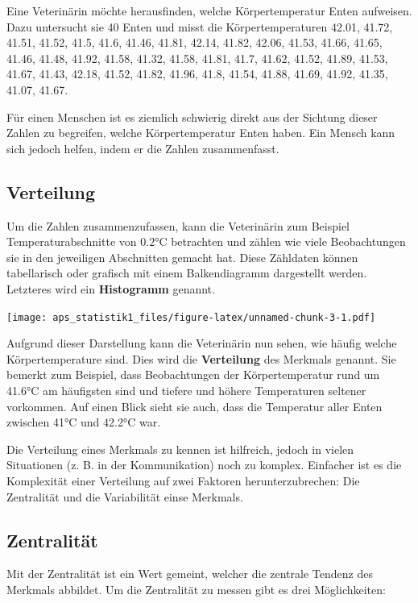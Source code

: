 \documentclass[
]{book}
\theoremstyle{definition}
\theoremstyle{definition}
\theoremstyle{definition}
\theoremstyle{definition}
\theoremstyle{remark}
\begin{document}
Eine Veterinärin möchte herausfinden, welche Körpertemperatur Enten aufweisen. Dazu untersucht sie 40 Enten und misst die Körpertemperaturen 42.01, 41.72, 41.51, 41.52, 41.5, 41.6, 41.46, 41.81, 42.14, 41.82, 42.06, 41.53, 41.66, 41.65, 41.46, 41.48, 41.92, 41.58, 41.32, 41.58, 41.81, 41.7, 41.62, 41.52, 41.89, 41.53, 41.67, 41.43, 42.18, 41.52, 41.82, 41.96, 41.8, 41.54, 41.88, 41.69, 41.92, 41.35, 41.07, 41.67.

Für einen Menschen ist es ziemlich schwierig direkt aus der Sichtung dieser Zahlen zu begreifen, welche Körpertemperatur Enten haben. Ein Mensch kann sich jedoch helfen, indem er die Zahlen zusammenfasst.

\subsection{Verteilung}\label{verteilung}

Um die Zahlen zusammenzufassen, kann die Veterinärin zum Beispiel Temperaturabschnitte von \(0.2\)°C betrachten und zählen wie viele Beobachtungen sie in den jeweiligen Abschnitten gemacht hat. Diese Zähldaten können tabellarisch oder grafisch mit einem Balkendiagramm dargestellt werden. Letzteres wird ein \textbf{Histogramm} genannt.

\texttt{[image: aps\_statistik1\_files/figure-latex/unnamed-chunk-3-1.pdf]}

Aufgrund dieser Darstellung kann die Veterinärin nun sehen, wie häufig welche Körpertemperature sind. Dies wird die \textbf{Verteilung} des Merkmals genannt. Sie bemerkt zum Beispiel, dass Beobachtungen der Körpertemperatur rund um 41.6°C am häufigsten sind und tiefere und höhere Temperaturen seltener vorkommen. Auf einen Blick sieht sie auch, dass die Temperatur aller Enten zwischen 41°C und 42.2°C war.

Die Verteilung eines Merkmals zu kennen ist hilfreich, jedoch in vielen Situationen (z. B. in der Kommunikation) noch zu komplex. Einfacher ist es die Komplexität einer Verteilung auf zwei Faktoren herunterzubrechen: Die Zentralität und die Variabilität einse Merkmals.

\subsection{Zentralität}\label{zentralituxe4t}

Mit der Zentralität ist ein Wert gemeint, welcher die zentrale Tendenz des Merkmals abbildet. Um die Zentralität zu messen gibt es drei Möglichkeiten:
\end{document}
